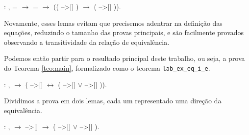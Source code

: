 \smallskip

 :
\coqdockw{\ensuremath{\forall}}   
,  = 
\ensuremath{\rightarrow}  = 
\ensuremath{\rightarrow} (( -->[] )
\ensuremath{\rightarrow} ( -->[]
)).\coqdoceol
\bigskip


Novamente, esses lemas evitam que precisemos adentrar na definição das
equações, reduzindo o tamanho das provas principais, e são facilmente provados
observando a transitividade da relação de equivalência.

\bigskip

Podemos então partir para o resultado principal deste trabalho, ou seja, a prova
do Teorema \ref{teo:main}, formalizado como o teorema
\texttt{lab\_ex\_eq\_i\_e}.

\bigskip

 :
\coqdockw{\ensuremath{\forall}}  ,
  \ensuremath{\rightarrow} (
-->[]  \ensuremath{\leftrightarrow} (
-->[]  \ensuremath{\lor} 
-->[] )).\coqdoceol

\bigskip

Dividimos a prova em dois lemas, cada um representado uma direção da
equivalência.

\bigskip

\coqdocnoindent {} :
\coqdockw{\ensuremath{\forall}}  ,
  \ensuremath{\rightarrow} 
-->[]  \ensuremath{\rightarrow} (
-->[]  \ensuremath{\lor} 
-->[] ).\coqdoceol

